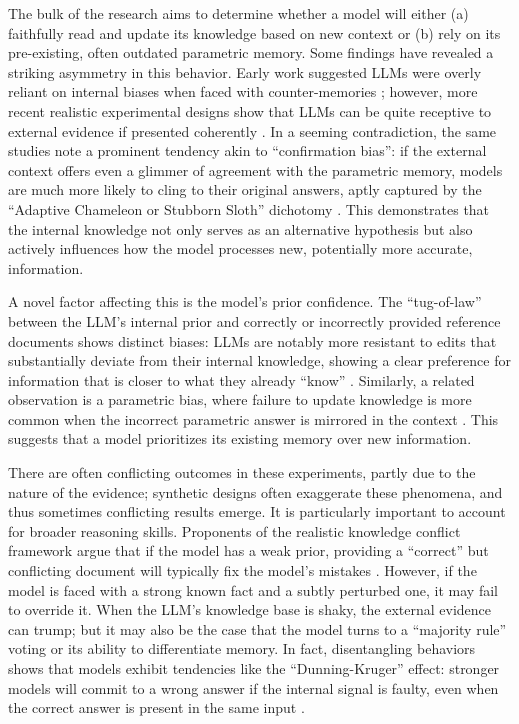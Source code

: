 \documentclass[11pt]{article}
\begin{document}
The bulk of the research aims to determine whether a model will either (a) faithfully read and update its knowledge based on new context or (b) rely on its pre-existing, often outdated parametric memory. Some findings have revealed a striking asymmetry in this behavior. Early work suggested LLMs were overly reliant on internal biases when faced with counter-memories \cite{ref252}; however, more recent realistic experimental designs show that LLMs can be quite receptive to external evidence if presented coherently \cite{ref28}. In a seeming contradiction, the same studies note a prominent tendency akin to ``confirmation bias'': if the external context offers even a glimmer of agreement with the parametric memory, models are much more likely to cling to their original answers, aptly captured by the ``Adaptive Chameleon or Stubborn Sloth'' dichotomy \cite{ref63}. This demonstrates that the internal knowledge not only serves as an alternative hypothesis but also actively influences how the model processes new, potentially more accurate, information.

A novel factor affecting this is the model's prior confidence. The ``tug-of-law'' between the LLM's internal prior and correctly or incorrectly provided reference documents shows distinct biases: LLMs are notably more resistant to edits that substantially deviate from their internal knowledge, showing a clear preference for information that is closer to what they already ``know'' \cite{ref37}. Similarly, a related observation is a parametric bias, where failure to update knowledge is more common when the incorrect parametric answer is mirrored in the context \cite{ref28}. This suggests that a model prioritizes its existing memory over new information.

There are often conflicting outcomes in these experiments, partly due to the nature of the evidence; synthetic designs often exaggerate these phenomena, and thus sometimes conflicting results emerge. It is particularly important to account for broader reasoning skills. Proponents of the realistic knowledge conflict framework argue that if the model has a weak prior, providing a ``correct'' but conflicting document will typically fix the model's mistakes \cite{ref28}. However, if the model is faced with a strong known fact and a subtly perturbed one, it may fail to override it. When the LLM's knowledge base is shaky, the external evidence can trump; but it may also be the case that the model turns to a ``majority rule'' voting or its ability to differentiate memory. In fact, disentangling behaviors shows that models exhibit tendencies like the ``Dunning-Kruger'' effect: stronger models will commit to a wrong answer if the internal signal is faulty, even when the correct answer is present in the same input \cite{ref253}.
\end{document}
